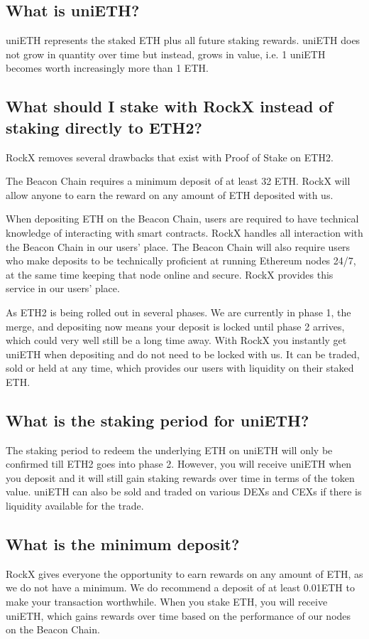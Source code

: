 \documentclass{article}
\begin{document}
\subsection{What is uniETH?}

uniETH represents the staked ETH plus all future staking rewards. uniETH does not grow in quantity over time but instead, grows in value, i.e. 1 uniETH becomes worth increasingly more than 1 ETH.

\subsection{What should I stake with RockX instead of staking directly to ETH2?}

RockX removes several drawbacks that exist with Proof of Stake on ETH2.

The Beacon Chain requires a minimum deposit of at least 32 ETH. RockX will allow anyone to earn the reward on any amount of ETH deposited with us.

When depositing ETH on the Beacon Chain, users are required to have technical knowledge of interacting with smart contracts. RockX handles all interaction with the Beacon Chain in our users’ place. The Beacon Chain will also require users who make deposits to be technically proficient at running Ethereum nodes 24/7, at the same time keeping that node online and secure. RockX provides this service in our users’ place.

As ETH2 is being rolled out in several phases. We are currently in phase 1, the merge, and depositing now means your deposit is locked until phase 2 arrives, which could very well still be a long time away. With RockX you instantly get uniETH when depositing and do not need to be locked with us. It can be traded, sold or held at any time, which provides our users with liquidity on their staked ETH.

\subsection{What is the staking period for uniETH?}
The staking period to redeem the underlying ETH on uniETH will only be confirmed till ETH2 goes into phase 2. However, you will receive uniETH when you deposit and it will still gain staking rewards over time in terms of the token value. uniETH can also be sold and traded on various DEXs and CEXs if there is liquidity available for the trade.

\subsection{What is the minimum deposit?}
RockX gives everyone the opportunity to earn rewards on any amount of ETH, as we do not have a minimum. We do recommend a deposit of at least 0.01ETH to make your transaction worthwhile. When you stake ETH, you will receive uniETH, which gains rewards over time based on the performance of our nodes on the Beacon Chain.
\end{document}
